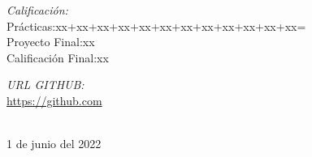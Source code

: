 \documentclass[a4paper,12pt]{report}
\begin{document}
\begin{titlepage}
\begin{center}
  \begin{flushleft} \large
    \emph{\color{orange!80!black}Calificación:}\\
    Prácticas:xx+xx+xx+xx+xx+xx+xx+xx+xx+xx+xx+xx=\\[0.5]
    Proyecto Final:xx\\[0.5]
    Calificación Final:xx
  \end{flushleft}
\begin{flushleft} \large
    \emph{\color{orange!80!black}URL GITHUB:}\\
   \url{https://github.com}
  \end{flushleft}

\vfill

{\large \color{orange!80!black}{UANL}\\ \color{blue!80!black}1 de junio del 2022}

\end{center}
\end{titlepage}
\end{document}
